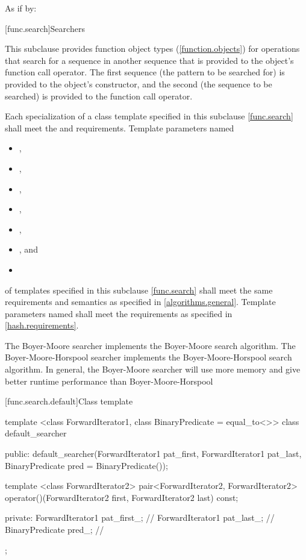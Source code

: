\begin{itemdescr}
\pnum\effects As if by: 
\end{itemdescr}%

[func.search]{Searchers}

\pnum
This subclause provides function object types (\ref{function.objects}) for
operations that search for a sequence  in another
sequence  that is provided to the object's function call
operator.  The first sequence (the pattern to be searched for) is provided to
the object's constructor, and the second (the sequence to be searched) is
provided to the function call operator.

\pnum
Each specialization of a class template specified in this subclause \ref{func.search} shall meet the  and  requirements.
Template parameters named
\begin{itemize}
\item {},
\item {},
\item {},
\item {},
\item {},
\item {}, and
\item {}
\end{itemize}
of templates specified in this subclause
\ref{func.search} shall meet the same requirements and semantics as
specified in \ref{algorithms.general}.
Template parameters named  shall meet the requirements as specified in \ref{hash.requirements}.

\pnum
The Boyer-Moore searcher implements the Boyer-Moore search algorithm.
The Boyer-Moore-Horspool searcher implements the Boyer-Moore-Horspool search algorithm.
In general, the Boyer-Moore searcher will use more memory and give better runtime performance than Boyer-Moore-Horspool

[func.search.default]{Class template }

%
\begin{codeblock}
template <class ForwardIterator1, class BinaryPredicate = equal_to<>>
  class default_searcher {
  public:
    default_searcher(ForwardIterator1 pat_first, ForwardIterator1 pat_last,
                     BinaryPredicate pred = BinaryPredicate());

    template <class ForwardIterator2>
      pair<ForwardIterator2, ForwardIterator2>
        operator()(ForwardIterator2 first, ForwardIterator2 last) const;

  private:
    ForwardIterator1 pat_first_;        // \expos
    ForwardIterator1 pat_last_;         // \expos
    BinaryPredicate pred_;              // \expos
  };
\end{codeblock}

